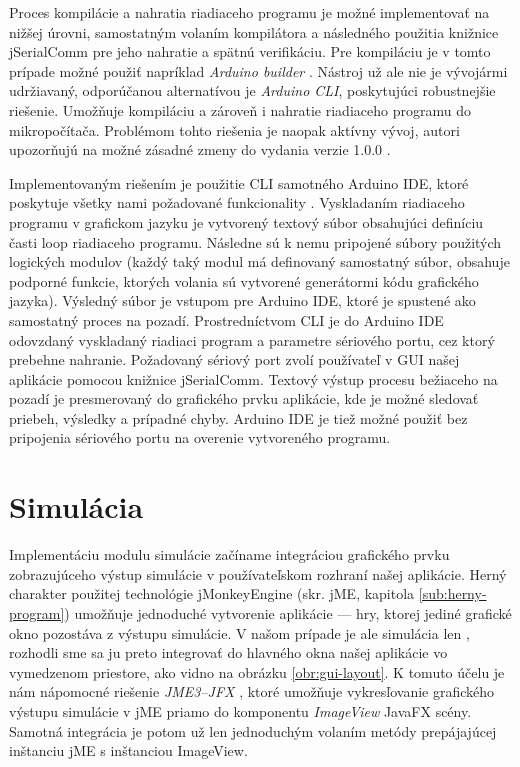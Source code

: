 Proces kompilácie a nahratia riadiaceho programu je možné implementovať na nižšej úrovni, samostatným volaním kompilátora a následného použitia knižnice jSerialComm pre jeho nahratie a spätnú verifikáciu. Pre kompiláciu je v tomto prípade možné použiť napríklad \textit{Arduino builder} \cite{arduinoBuilder}. Nástroj už ale nie je vývojármi udržiavaný, odporúčanou alternatívou je \textit{Arduino CLI}, poskytujúci robustnejšie riešenie. Umožňuje kompiláciu a zároveň i nahratie riadiaceho programu do mikropočítača. Problémom tohto riešenia je naopak aktívny vývoj, autori upozorňujú na možné zásadné zmeny do vydania verzie 1.0.0 \cite{arduinoCli}.

Implementovaným riešením je použitie CLI samotného Arduino IDE, ktoré poskytuje všetky nami požadované funkcionality \cite{arduinoIdeCli}. Vyskladaním riadiaceho programu v grafickom jazyku je vytvorený textový súbor obsahujúci definíciu časti loop riadiaceho programu. Následne sú k nemu pripojené súbory použitých logických modulov (každý taký modul má definovaný samostatný súbor, obsahuje podporné funkcie, ktorých volania sú vytvorené generátormi kódu grafického jazyka). Výsledný súbor je vstupom pre Arduino IDE, ktoré je spustené ako samostatný proces na pozadí. Prostredníctvom CLI je do Arduino IDE odovzdaný vyskladaný riadiaci program a parametre sériového portu, cez ktorý prebehne nahranie. Požadovaný sériový port zvolí používateľ v GUI našej aplikácie pomocou knižnice jSerialComm. Textový výstup procesu bežiaceho na pozadí je presmerovaný do grafického prvku aplikácie, kde je možné sledovať priebeh, výsledky a prípadné chyby. Arduino IDE je tiež možné použiť bez pripojenia sériového portu na overenie vytvoreného programu.


\section{Simulácia}
Implementáciu modulu simulácie začíname integráciou grafického prvku zobrazujúceho výstup simulácie v používateľskom rozhraní našej aplikácie. Herný charakter použitej technológie jMonkeyEngine (skr. jME, kapitola \ref{sub:herny-program}) umožňuje jednoduché vytvorenie aplikácie --- hry, ktorej jediné grafické okno pozostáva z výstupu simulácie. V našom prípade je ale simulácia len , rozhodli sme sa ju preto integrovať do hlavného okna našej aplikácie vo vymedzenom priestore, ako vidno na obrázku \ref{obr:gui-layout}. K tomuto účelu je nám nápomocné riešenie \textit{JME3--JFX} \cite{jmejfx}, ktoré umožňuje vykresľovanie grafického výstupu simulácie v jME priamo do komponentu \textit{ImageView} JavaFX scény. Samotná integrácia je potom už len jednoduchým volaním metódy prepájajúcej inštanciu jME s inštanciou ImageView.

